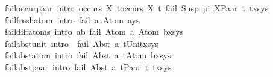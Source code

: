 \begin{isabellebody}
fail{\isacharunderscore}{\kern0pt}occur{\isacharunderscore}{\kern0pt}paar\ {\isacharbrackleft}{\kern0pt}intro{\isacharbang}{\kern0pt}{\isacharbrackright}{\kern0pt}{\isacharcolon}{\kern0pt}\ {\isachardoublequoteopen}{\isasymlbrakk}occurs\ X\ t{}{\isasymor}occurs\ X\ t{}{\isasymrbrakk}{\isasymLongrightarrow}\ fail\ {\isacharparenleft}{\kern0pt}Susp\ pi\ X{\isasymapprox}{\isacharquery}{\kern0pt}Paar\ t{}\ t{}{\isacharhash}{\kern0pt}xs{\isacharcomma}{\kern0pt}ys{\isacharparenright}{\kern0pt}{\isachardoublequoteclose}\ {\isacharbar}{\kern0pt}\isanewline
fail{\isacharunderscore}{\kern0pt}fresh{\isacharunderscore}{\kern0pt}atom\ {\isacharbrackleft}{\kern0pt}intro{\isacharbang}{\kern0pt}{\isacharbrackright}{\kern0pt}{\isacharcolon}{\kern0pt}\ {\isachardoublequoteopen}fail\ {\isacharparenleft}{\kern0pt}{\isacharbrackleft}{\kern0pt}{\isacharbrackright}{\kern0pt}{\isacharcomma}{\kern0pt}a{\isasymsharp}{\isacharquery}{\kern0pt}\ Atom\ a{\isacharhash}{\kern0pt}ys{\isacharparenright}{\kern0pt}{\isachardoublequoteclose}{\isacharbar}{\kern0pt}\isanewline
fail{\isacharunderscore}{\kern0pt}diff{\isacharunderscore}{\kern0pt}atoms\ {\isacharbrackleft}{\kern0pt}intro{\isacharbang}{\kern0pt}{\isacharbrackright}{\kern0pt}{\isacharcolon}{\kern0pt}\ {\isachardoublequoteopen}a{\isasymnoteq}b{\isasymLongrightarrow}\ fail\ {\isacharparenleft}{\kern0pt}Atom\ a{\isasymapprox}{\isacharquery}{\kern0pt}\ Atom\ b{\isacharhash}{\kern0pt}xs{\isacharcomma}{\kern0pt}ys{\isacharparenright}{\kern0pt}{\isachardoublequoteclose}\ {\isacharbar}{\kern0pt}\isanewline
fail{\isacharunderscore}{\kern0pt}abst{\isacharunderscore}{\kern0pt}unit\ {\isacharbrackleft}{\kern0pt}intro{\isacharbang}{\kern0pt}{\isacharbrackright}{\kern0pt}{\isacharcolon}{\kern0pt}\ {\isachardoublequoteopen}\ fail\ {\isacharparenleft}{\kern0pt}Abst\ a\ t{\isasymapprox}{\isacharquery}{\kern0pt}Unit{\isacharhash}{\kern0pt}xs{\isacharcomma}{\kern0pt}ys{\isacharparenright}{\kern0pt}{\isachardoublequoteclose}\ {\isacharbar}{\kern0pt}\isanewline
fail{\isacharunderscore}{\kern0pt}abst{\isacharunderscore}{\kern0pt}atom\ {\isacharbrackleft}{\kern0pt}intro{\isacharbang}{\kern0pt}{\isacharbrackright}{\kern0pt}{\isacharcolon}{\kern0pt}\ {\isachardoublequoteopen}fail\ {\isacharparenleft}{\kern0pt}Abst\ a\ t{\isasymapprox}{\isacharquery}{\kern0pt}Atom\ b{\isacharhash}{\kern0pt}xs{\isacharcomma}{\kern0pt}ys{\isacharparenright}{\kern0pt}{\isachardoublequoteclose}\ {\isacharbar}{\kern0pt}\isanewline
fail{\isacharunderscore}{\kern0pt}abst{\isacharunderscore}{\kern0pt}paar\ {\isacharbrackleft}{\kern0pt}intro{\isacharbang}{\kern0pt}{\isacharbrackright}{\kern0pt}{\isacharcolon}{\kern0pt}\ {\isachardoublequoteopen}fail\ {\isacharparenleft}{\kern0pt}Abst\ a\ t{\isasymapprox}{\isacharquery}{\kern0pt}Paar\ t{}\ t{}{\isacharhash}{\kern0pt}xs{\isacharcomma}{\kern0pt}ys{\isacharparenright}{\kern0pt}{\isachardoublequoteclose}\ {\isacharbar}{\kern0pt}\ \isanewline

\end{isabellebody}

